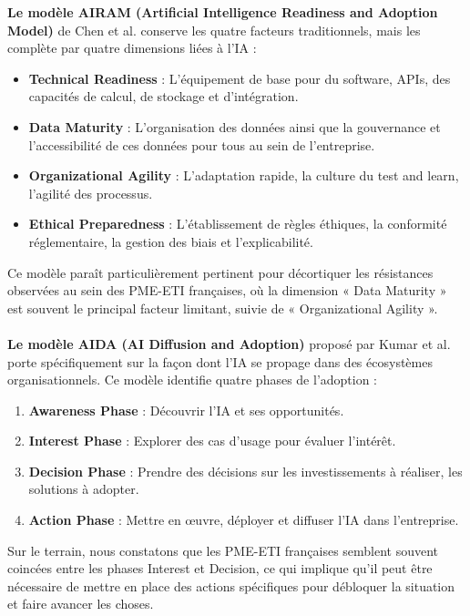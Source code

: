 \textbf{Le modèle AIRAM (Artificial Intelligence Readiness and Adoption Model)} de Chen et al. conserve les quatre facteurs traditionnels, mais les complète par quatre dimensions liées à l’IA :

\begin{itemize}
    \item \textbf{Technical Readiness} : L’équipement de base pour du software, APIs, des capacités de calcul, de stockage et d’intégration.
    \item \textbf{Data Maturity} : L’organisation des données ainsi que la gouvernance et l’accessibilité de ces données pour tous au sein de l’entreprise.
    \item \textbf{Organizational Agility} : L’adaptation rapide, la culture du test and learn, l’agilité des processus.
    \item \textbf{Ethical Preparedness} : L’établissement de règles éthiques, la conformité réglementaire, la gestion des biais et l’explicabilité.
\end{itemize}
\medskip
Ce modèle paraît particulièrement pertinent pour décortiquer les résistances observées au sein des PME-ETI françaises, où la dimension « Data Maturity » est souvent le principal facteur limitant, suivie de « Organizational Agility ».
\\\\
\textbf{Le modèle AIDA (AI Diffusion and Adoption)} proposé par Kumar et al. porte spécifiquement sur la façon dont l’IA se propage dans des écosystèmes organisationnels. Ce modèle identifie quatre phases de l’adoption :

\begin{enumerate}
    \item \textbf{Awareness Phase} : Découvrir l’IA et ses opportunités.
    \item \textbf{Interest Phase} : Explorer des cas d’usage pour évaluer l’intérêt.
    \item \textbf{Decision Phase} : Prendre des décisions sur les investissements à réaliser, les solutions à adopter.
    \item \textbf{Action Phase} : Mettre en œuvre, déployer et diffuser l’IA dans l’entreprise.
\end{enumerate}

Sur le terrain, nous constatons que les PME-ETI françaises semblent souvent coincées entre les phases Interest et Decision, ce qui implique qu’il peut être nécessaire de mettre en place des actions spécifiques pour débloquer la situation et faire avancer les choses.

